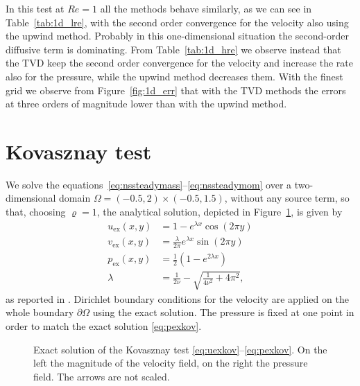 In this test at $Re=1$ all the methods behave similarly, as we 
can see in Table~\ref{tab:1d_lre}, with the second order convergence for the 
velocity also using the upwind method. Probably in this one-dimensional 
situation the second-order diffusive term is dominating. From 
Table~\ref{tab:1d_hre} we observe instead that the TVD keep the second order 
convergence for the velocity and increase the rate also for the pressure, while 
the upwind method decreases them. With the finest grid we observe from 
Figure~\ref{fig:1d_err} that with the TVD methods the errors at three orders of 
magnitude lower than with the upwind method.

%
\section{Kovasznay test}
We solve the equations~\eqref{eq:nssteadymass}--\eqref{eq:nssteadymom} over a 
two-dimensional domain $\Omega=(-0.5, 2) \times (-0.5,1.5)$, without any source 
term, so that, choosing $\varrho=1$, the analytical solution, depicted in 
Figure~\ref{fig:kovexact}, is given by
\begin{align}
\label{eq:uexkov} u_\text{ex}(x,y) &= 1-e^{\lambda x} \cos (2 \pi y)\\
v_\text{ex}(x,y) &= \frac{\lambda}{2\pi} e^{\lambda x} \sin (2\pi y)\\
\label{eq:pexkov}	p_\text{ex}(x,y) &= \frac{1}{2}(1 -e^{2\lambda x})\\
\lambda &= \frac{1}{2 \nu} - \sqrt{\frac{1}{4 \nu^2} + 4\pi^2},
\end{align}
as reported in \cite{test:kovasznay}.
Dirichlet boundary conditions for the velocity are applied on the whole 
boundary $\partial \Omega$ using the exact solution. The pressure is fixed at 
one point in order to match the exact solution \eqref{eq:pexkov}.
\begin{figure}
	\centering
	\caption[Exact solution of the Kovasznay test]{Exact solution of the 
	Kovasznay test \eqref{eq:uexkov}--\eqref{eq:pexkov}. On the left the 
	magnitude of the velocity field, on the 
	right the pressure field. The arrows are not scaled.}
	\label{fig:kovexact}
\end{figure}

